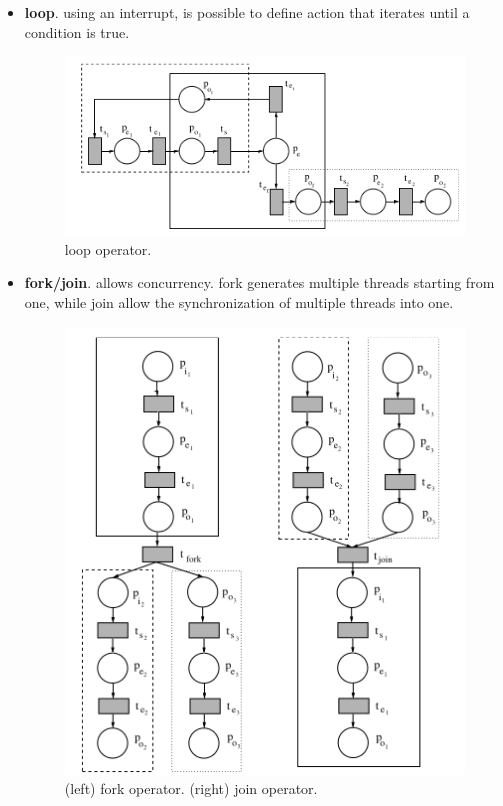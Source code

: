 \documentclass[pdftex,12pt,a4paper]{report}
\begin{document}
\begin{itemize}
\item \textbf{loop}. using an interrupt, is possible to define action that iterates until a condition is true.
\begin{figure}[H]
	\centering
	\includegraphics[scale=0.5]{images/loop.png}
	\caption{loop operator.}
\end{figure}
\item \textbf{fork/join}. allows concurrency. fork generates multiple threads starting from one, while join allow the synchronization of multiple threads into one.
\begin{figure}[H]
	\centering
	\includegraphics[scale=0.5]{images/fork_join.png}
	\caption{(left) fork operator. (right) join operator.}
\end{figure}
\end{itemize}
\end{document}
